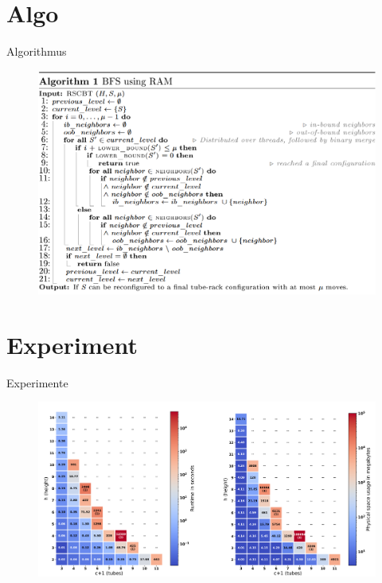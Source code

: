 \documentclass{beamer}
\begin{document}
\section*{Algo}
\begin{frame}{Algorithmus}
\begin{figure}
    \centering
    \includegraphics[width=\textwidth]{algo}
\end{figure}
\end{frame}

\section*{Experiment}
\begin{frame}{Experimente}
\begin{figure}
    \centering
    \includegraphics[width=\textwidth]{topexp}
\end{figure}
\end{frame}
\end{document}
